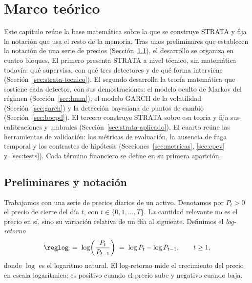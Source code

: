 \chapter{Marco teórico}
\label{cap:marco-teorico}


Este capítulo reúne la base matemática sobre la que se construye STRATA y fija la notación que usa el resto de la memoria. Tras unos preliminares que establecen la notación de una serie de precios (Sección~\ref{sec:preliminares}), el desarrollo se organiza en cuatro bloques. El primero presenta STRATA a nivel técnico, sin matemática todavía: qué supervisa, con qué tres detectores y de qué forma interviene (Sección~\ref{sec:strata-tecnico}). El segundo desarrolla la teoría matemática que sostiene cada detector, con sus demostraciones: el modelo oculto de Markov del régimen (Sección~\ref{sec:hmm}), el modelo GARCH de la volatilidad (Sección~\ref{sec:garch}) y la detección bayesiana de puntos de cambio (Sección~\ref{sec:bocpd}). El tercero construye STRATA sobre esa teoría y fija sus calibraciones y umbrales (Sección~\ref{sec:strata-aplicado}). El cuarto reúne las herramientas de validación: las métricas de evaluación, la ausencia de fuga temporal y los contrastes de hipótesis (Secciones~\ref{sec:metricas}, \ref{sec:cpcv} y~\ref{sec:tests}). Cada término financiero se define en su primera aparición.

\section{Preliminares y notación}
\label{sec:preliminares}

Trabajamos con una serie de precios diarios de un activo. Denotamos por $P_t > 0$ el precio de cierre del día $t$, con $t \in \{0, 1, \dots, T\}$. La cantidad relevante no es el precio en sí, sino su variación relativa de un día al siguiente. Definimos el \emph{log-retorno}
\[
\reglog \;=\; \log\!\left(\frac{P_t}{P_{t-1}}\right) \;=\; \log P_t - \log P_{t-1}, \qquad t \ge 1,
\]
donde $\log$ es el logaritmo natural. El log-retorno mide el crecimiento del precio en escala logarítmica; es positivo cuando el precio sube y negativo cuando baja.

